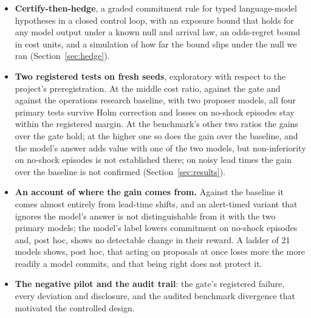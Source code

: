 \begin{itemize}\itemsep0pt
\item \textbf{Certify-then-hedge}, a graded commitment rule for typed language-model
      hypotheses in a closed control loop, with an exposure bound that holds for any model
      output under a known null and arrival law, an odds-regret bound in cost units, and a
      simulation of how far the bound slips under the null we ran (Section~\ref{sec:hedge}).
\item \textbf{Two registered tests on fresh seeds}, exploratory with respect to the project's
      preregistration. At the middle cost ratio, against the gate and against the operations
      research baseline, with two proposer models, all four primary tests survive Holm
      correction and losses on no-shock episodes stay within the registered margin. At the
      benchmark's other two ratios the gains over the gate hold; at the higher one so does the
      gain over the baseline, and the model's answer adds value with one of the two models, but
      non-inferiority on no-shock episodes is not established there; on noisy lead times the
      gain over the baseline is not confirmed (Section~\ref{sec:results}).
\item \textbf{An account of where the gain comes from.} Against the baseline it comes almost
      entirely from lead-time shifts, and an alert-timed variant that ignores the model's
      answer is not distinguishable from it with the two primary models;
      the model's label lowers commitment on no-shock episodes and, post hoc, shows no
      detectable change in their reward. A ladder of 21 models shows, post hoc, that acting on proposals at once
      loses more the more readily a model commits, and that being right does not protect it.
\item \textbf{The negative pilot and the audit trail}: the gate's registered failure, every
      deviation and disclosure, and the audited benchmark divergence that motivated the
      controlled design.
\end{itemize}
